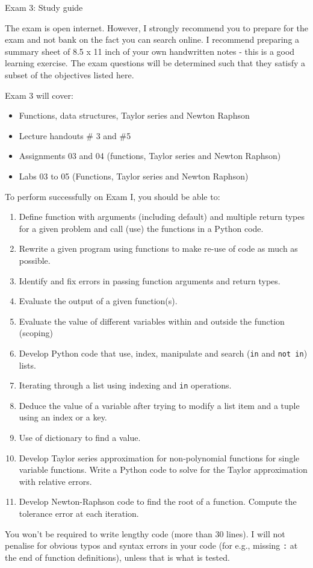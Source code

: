 \documentclass[]{article}
\begin{document}
\begin{center}
\Large Exam 3: Study guide
\end{center}

The exam is open internet. However, I strongly recommend you to prepare for the exam and not bank on the fact you can search online. I recommend preparing a summary sheet of 8.5 x 11 inch of your own handwritten notes - this is a good learning exercise. The exam questions will be determined such that they satisfy a subset of the objectives listed here.

Exam 3 will cover:
\begin{itemize}
	\item Functions, data structures, Taylor series and Newton Raphson
	\item Lecture handouts \# 3 and \#5 
	\item Assignments 03 and 04 (functions, Taylor series and Newton Raphson)
	\item Labs 03 to 05 (Functions, Taylor series and Newton Raphson)
\end{itemize}

To perform successfully on Exam I, you should be able to:

\begin{enumerate}
	\item Define function with arguments (including default) and multiple return types for a given problem and call (use) the functions in a Python code.
	\item Rewrite a given program using functions to make re-use of code as much as possible.
\item Identify and fix errors in passing function arguments and return types.
	\item Evaluate the output of a given function(s).
	\item Evaluate the value of different variables within and outside the function (scoping)
	\item Develop Python code that use, index, manipulate and search (\verb|in| and \verb|not in|) lists.
	\item Iterating through a list using indexing and \verb|in| operations.
	\item Deduce the value of a variable after trying to modify a list item and a tuple using an index or a key.
	\item Use of dictionary to find a value.
	\item Develop Taylor series approximation for non-polynomial functions for single variable functions. Write a Python code to solve for the Taylor approximation with relative errors.
	\item Develop Newton-Raphson code to find the root of a function. Compute the tolerance error at each iteration.

\end{enumerate}

You won't be required to write lengthy code (more than 30 lines). I will not penalise for obvious typos and syntax errors in your code (for e.g., missing \verb|:| at the end of function definitions), unless that is what is tested.
\end{document}
